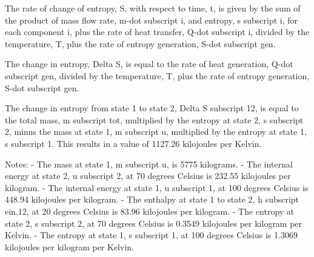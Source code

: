 The rate of change of entropy, S, with respect to time, t, is given by the sum of the product of mass flow rate, m-dot subscript i, and entropy, s subscript i, for each component i, plus the rate of heat transfer, Q-dot subscript i, divided by the temperature, T, plus the rate of entropy generation, S-dot subscript gen.

The change in entropy, Delta S, is equal to the rate of heat generation, Q-dot subscript gen, divided by the temperature, T, plus the rate of entropy generation, S-dot subscript gen.

The change in entropy from state 1 to state 2, Delta S subscript 12, is equal to the total mass, m subscript tot, multiplied by the entropy at state 2, s subscript 2, minus the mass at state 1, m subscript u, multiplied by the entropy at state 1, s subscript 1. This results in a value of 1127.26 kilojoules per Kelvin.

Notes:
- The mass at state 1, m subscript u, is 5775 kilograms.
- The internal energy at state 2, u subscript 2, at 70 degrees Celsius is 232.55 kilojoules per kilogram.
- The internal energy at state 1, u subscript 1, at 100 degrees Celsius is 448.94 kilojoules per kilogram.
- The enthalpy at state 1 to state 2, h subscript ein,12, at 20 degrees Celsius is 83.96 kilojoules per kilogram.
- The entropy at state 2, s subscript 2, at 70 degrees Celsius is 0.3549 kilojoules per kilogram per Kelvin.
- The entropy at state 1, s subscript 1, at 100 degrees Celsius is 1.3069 kilojoules per kilogram per Kelvin.